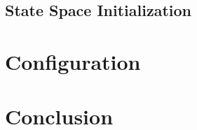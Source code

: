 \subsection{State Space Initialization}

\clearpage
\section{Configuration}
\label{des:conf}

\section{Conclusion}
\label{des:conc}